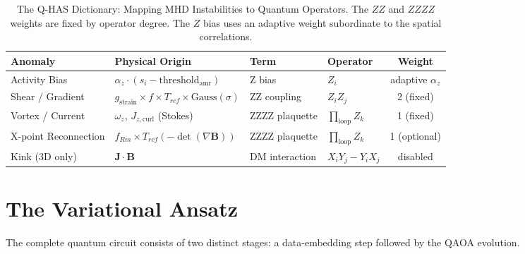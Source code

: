 \documentclass[12pt, a4paper, oneside]{report}
\begin{document}
\begin{table}[h!]
\centering
\begin{tabular}{|l|l|l|l|c|}
\hline
\textbf{Anomaly} & \textbf{Physical Origin} & \textbf{Term} & \textbf{Operator} & \textbf{Weight} \\ \hline
Activity Bias & $\alpha_z \cdot (s_i - \text{threshold}_{\text{amr}})$ & Z bias & $Z_i$ & adaptive $\alpha_z$ \\ \hline
Shear / Gradient & $g_{\text{strain}} \times f \times T_{rcf} \times \text{Gauss}(\sigma)$ & ZZ coupling & $Z_i Z_j$ & 2 (fixed) \\ \hline
Vortex / Current & $\omega_z$, $J_{z,\text{curl}}$ (Stokes) & ZZZZ plaquette & $\prod_{\text{loop}} Z_k$ & 1 (fixed) \\ \hline
X-point Reconnection & $f_{Rm} \times T_{rcf}(-\det(\nabla\mathbf{B}))$ & ZZZZ plaquette & $\prod_{\text{loop}} Z_k$ & 1 (optional) \\ \hline
Kink (3D only) & $\mathbf{J} \cdot \mathbf{B}$ & DM interaction & $X_i Y_j - Y_i X_j$ & disabled \\ \hline
\end{tabular}
\caption{The Q-HAS Dictionary: Mapping MHD Instabilities to Quantum Operators. The $ZZ$ and $ZZZZ$ weights are fixed by operator degree. The $Z$ bias uses an adaptive weight subordinate to the spatial correlations.}
\label{tab:mapping}
\end{table}

\section{The Variational Ansatz}
The complete quantum circuit consists of two distinct stages: a data-embedding step followed by the QAOA evolution.
\end{document}
